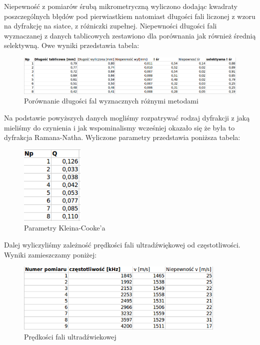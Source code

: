 \documentclass[a4paper,12pt]{article}
\begin{document}
Niepewność z pomiarów śrubą mikrometryczną wyliczono dodając kwadraty poszczególnych błędów pod pierwiastkiem natomiast długości fali liczonej z wzoru na dyfrakcję na siatce, z różniczki zupełnej. Niepewności długości fali wyznaczanej z danych tablicowych zestawiono dla porównania jak również średnią selektywną. Owe wyniki przedstawia tabela: 


\begin{figure} [H]
  \begin{center}
    \includegraphics[width = 17cm]{tab5.png}
    \caption{Porównanie długości fal wyznacznych różnymi metodami}
  \end{center}
\end{figure}

Na podstawie powyższych danych mogliśmy rozpatrywać rodzaj dyfrakcji z jaką mieliśmy do czynienia i jak wspominalismy wcześniej okazało się że była to dyfrakcja Ramana-Natha. Wyliczone parametry  przedstawia poniższa tabela: 

\begin{figure} [H]
  \begin{center}
    \includegraphics[width = 3cm]{tab6.png}
    \caption{Parametry Kleina-Cooke'a}
  \end{center}
\end{figure}

Dalej wyliczyliśmy zależność prędkości fali ultradźwiękowej od częstotliwości. Wyniki zamieszczamy poniżej: 

\begin{figure} [H]
  \begin{center}
    \includegraphics[width = 10cm]{tab7.png}
    \caption{Prędkości fali ultradźwiekowej}
  \end{center}
\end{figure}
\end{document}
